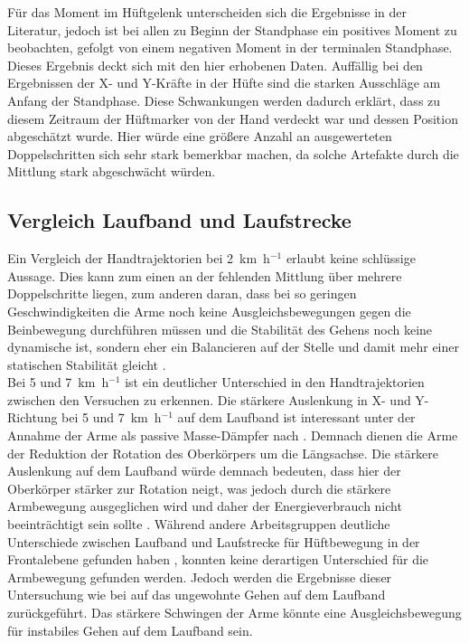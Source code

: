 Für das Moment im Hüftgelenk unterscheiden sich die Ergebnisse in der Literatur, jedoch ist bei allen zu Beginn der Standphase ein positives Moment zu beobachten, gefolgt von einem negativen Moment in der terminalen Standphase. Dieses Ergebnis deckt sich mit den hier erhobenen Daten. Auffällig bei den Ergebnissen der X- und Y-Kräfte in der Hüfte sind die starken Ausschläge am Anfang der Standphase. Diese Schwankungen werden dadurch erklärt, dass zu diesem Zeitraum der Hüftmarker von der Hand verdeckt war und dessen Position abgeschätzt wurde. Hier würde eine größere Anzahl an ausgewerteten Doppelschritten sich sehr stark bemerkbar machen, da solche Artefakte durch die Mittlung stark abgeschwächt würden.


\subsection{Vergleich Laufband und Laufstrecke}
Ein Vergleich der Handtrajektorien bei 2~km~h$^{-1}$ erlaubt keine schlüssige Aussage. Dies kann zum einen an der fehlenden Mittlung über mehrere Doppelschritte liegen, zum anderen daran, dass bei so geringen Geschwindigkeiten die Arme noch keine Ausgleichsbewegungen gegen die Beinbewegung durchführen müssen und die Stabilität des Gehens noch keine dynamische ist, sondern eher ein Balancieren auf der Stelle und damit mehr einer statischen Stabilität gleicht \parencite{barbareschi2015statically}.\\
Bei 5 und 7~km~h$^{-1}$ ist ein deutlicher Unterschied in den Handtrajektorien zwischen den Versuchen zu erkennen. Die stärkere Auslenkung in X- und Y-Richtung bei 5 und 7~km~h$^{-1}$ auf dem Laufband ist interessant unter der Annahme der Arme als passive Masse-Dämpfer nach \textcite{pontzer2009control}. Demnach dienen die Arme der Reduktion der Rotation des Oberkörpers um die Längsachse. Die stärkere Auslenkung auf dem Laufband würde demnach bedeuten, dass hier der Oberkörper stärker zur Rotation neigt, was jedoch durch die stärkere Armbewegung ausgeglichen wird und daher der Energieverbrauch nicht beeinträchtigt sein sollte \parencite{pontzer2009control}. Während andere Arbeitsgruppen deutliche Unterschiede zwischen Laufband und Laufstrecke für Hüftbewegung in der Frontalebene gefunden haben \parencite{alton1998kinematic}, konnten keine derartigen Unterschied für die Armbewegung gefunden werden. Jedoch werden die Ergebnisse dieser Untersuchung wie bei \textcite{alton1998kinematic} auf das ungewohnte Gehen auf dem Laufband zurückgeführt. Das stärkere Schwingen der Arme könnte eine Ausgleichsbewegung für instabiles Gehen auf dem Laufband sein.\\
